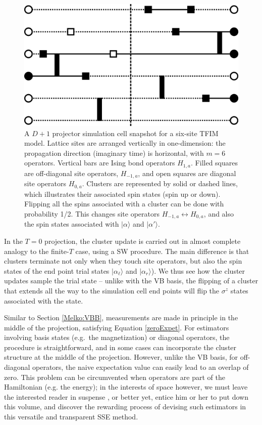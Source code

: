 \documentclass[vecphys]{svmult}
\begin{document}
\begin{figure}[t]
\centering
\includegraphics*[width=.85\textwidth]{zeroT_tfim.eps}
\caption[]{A $D+1$ projector simulation cell snapshot for a six-site TFIM model.  Lattice sites are arranged vertically in one-dimension: the propagation direction (imaginary time) is horizontal, with $m=6$ operators.  
Vertical bars are Ising bond operators $H_{1,a}$.  Filled squares are off-diagonal site operators, $H_{-1,a}$, and open squares are diagonal site operators $H_{0,a}$.
Clusters are represented by solid or dashed lines, which illustrates their associated spin states (spin up or down).  Flipping all the spins associated with a cluster can be done with probability 1/2.  This changes site operators $H_{-1,a} \leftrightarrow H_{0,a}$, and also the spin states associated with  $|\alpha \rangle$ and $|\alpha' \rangle$.}
\label{fig:5}      
\end{figure} 

In the $T=0$ projection, the cluster update is carried out in almost complete analogy to the finite-$T$ case, using a SW procedure.  The main difference is that clusters terminate not only when they touch site operators, but also the spin states of the end point trial states $|\alpha_{\ell} \rangle$ and $|\alpha_r \rangle$).  We thus see how the cluster updates sample the trial state -- unlike with the VB basis, the flipping of a cluster that extends all the way to the simulation cell end points will flip the $\sigma^z$ states associated with the state. 

Similar to Section \ref{Melko:VBB}, measurements are made in principle in the middle of the projection, satisfying Equation \ref{zeroExpet}.  
For estimators involving basis states (e.g.~the magnetization) or diagonal operators, the procedure is straightforward, and in some cases can incorporate the cluster structure at the middle of the projection.
However, unlike the VB basis, for off-diagonal operators, the naive expectation value can easily lead to an overlap of zero.  This problem can be circumvented when operators are part of the Hamiltonian (e.g. the energy); in the interests of space however, we must leave the interested reader in suspense \cite{Melko:unpub}, or better yet, entice him or her to put down this volume, and discover the rewarding process of devising such estimators in this versatile and transparent SSE method.
\end{document}
